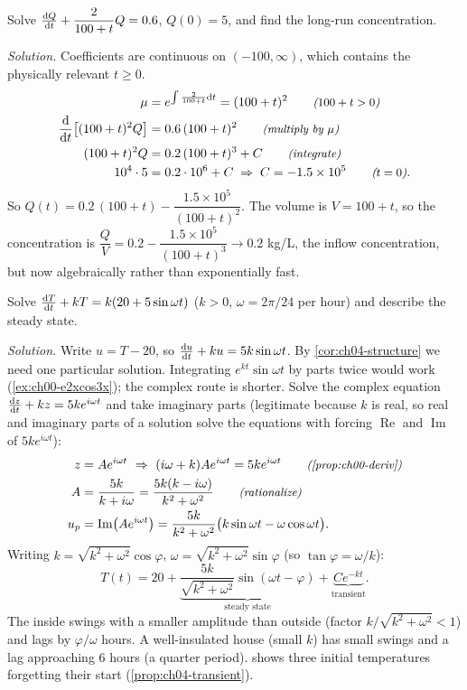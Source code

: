 \begin{example}\label{ex:ch04-tank}
Solve $\frac{\mathrm{d}Q}{\mathrm{d}t} + \dfrac{2}{100+t}Q = 0.6$, $Q(0) = 5$, and find the
long-run concentration.

\emph{Solution.} Coefficients are continuous on $(-100,\infty)$, which
contains the physically relevant $t\ge0$.
\begin{align*}
  \mu &= e^{\int\frac{2}{100+t}\mathrm{d}t} = (100+t)^2 \qquad\text{\small\itshape($100+t>0$)}\\
  \frac{\mathrm{d}}{\mathrm{d}t}\bigl[(100+t)^2Q\bigr] &= 0.6\,(100+t)^2 \qquad\text{\small\itshape(multiply by $\mu$)}\\
  (100+t)^2Q &= 0.2\,(100+t)^3 + C \qquad\text{\small\itshape(integrate)}\\
  10^4\cdot 5 &= 0.2\cdot10^6 + C\;\Rightarrow\;C = -1.5\times10^5 \qquad\text{\small\itshape($t = 0$)}.
\end{align*}
So $Q(t) = 0.2\,(100+t) - \dfrac{1.5\times10^5}{(100+t)^2}$. The volume is
$V = 100 + t$, so the concentration is
$\dfrac{Q}{V} = 0.2 - \dfrac{1.5\times10^5}{(100+t)^3}\to 0.2$ kg/L, the inflow
concentration, but now algebraically rather than exponentially fast.
\end{example}

\begin{example}\label{ex:ch04-house}
Solve $\frac{\mathrm{d}T}{\mathrm{d}t} + kT = k(20 + 5\sin\omega t)$ ($k>0$, $\omega = 2\pi/24$ per
hour) and describe the steady state.

\emph{Solution.} Write $u = T - 20$, so $\frac{\mathrm{d}u}{\mathrm{d}t} + ku = 5k\sin\omega t$. By
\cref{cor:ch04-structure} we need one particular solution. Integrating
$e^{kt}\sin\omega t$ by parts twice would work (\cref{ex:ch00-e2xcos3x}); the
complex route is shorter. Solve the complex equation
$\frac{\mathrm{d}z}{\mathrm{d}t} + kz = 5ke^{i\omega t}$ and take imaginary parts (legitimate
because $k$ is real, so real and imaginary parts of a solution solve the
equations with forcing $\operatorname{Re}$ and $\operatorname{Im}$ of
$5ke^{i\omega t}$):
\begin{align*}
  z &= Ae^{i\omega t}\ \Rightarrow\ (i\omega + k)Ae^{i\omega t} = 5ke^{i\omega t}
     \why{\cref{prop:ch00-deriv}}\\
  A &= \frac{5k}{k + i\omega} = \frac{5k(k - i\omega)}{k^2 + \omega^2}
     \why{rationalize}\\
  u_p &= \operatorname{Im}\bigl(Ae^{i\omega t}\bigr)
       = \frac{5k}{k^2+\omega^2}\bigl(k\sin\omega t - \omega\cos\omega t\bigr).
\end{align*}
Writing $k = \sqrt{k^2+\omega^2}\cos\varphi$, $\omega = \sqrt{k^2+\omega^2}\sin\varphi$
(so $\tan\varphi = \omega/k$):
\[
  T(t) = 20 + \underbrace{\frac{5k}{\sqrt{k^2+\omega^2}}\sin(\omega t - \varphi)}_{\text{steady state}}
       + \underbrace{Ce^{-kt}}_{\text{transient}} .
\]
The inside swings with a smaller amplitude than outside (factor
$k/\sqrt{k^2+\omega^2}<1$) and lags by $\varphi/\omega$ hours. A
well-insulated house (small $k$) has small swings and a lag approaching $6$
hours (a quarter period).  shows three initial
temperatures forgetting their start (\cref{prop:ch04-transient}).
\end{example}


